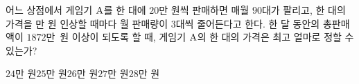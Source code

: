 어느 상점에서 게임기 $\mathrm{A}$를 한 대에 $20$만 원씩 판매하면 매월 $90$대가 팔리고, 한 대의 가격을 만 원 인상할 때마다 월 판매량이 $3$대씩 줄어든다고 한다. 한 달 동안의 총판매액이 \mbox{$1872$만 원} 이상이 되도록 할 때, 게임기 $\mathrm{A}$의 한 대의 가격은 최고 얼마로 정할 수 있는가?
\begin{choices32}{$24$만 원}{$25$만 원}{$26$만 원}{$27$만 원}{$28$만 원}\end{choices32}
